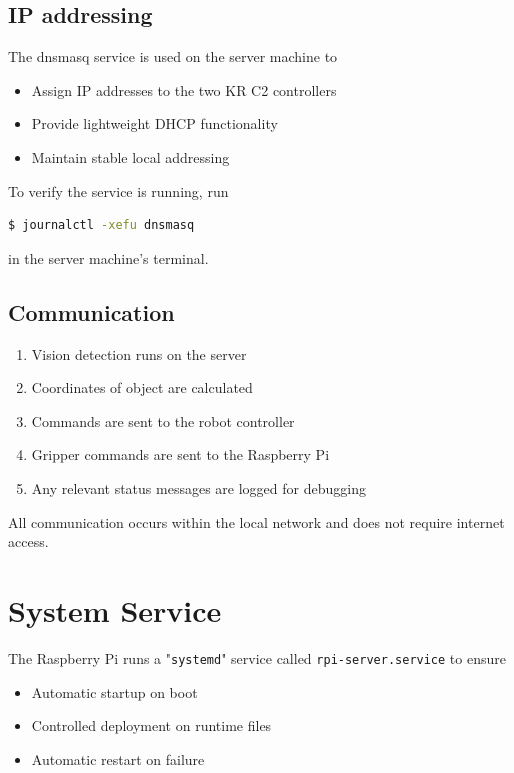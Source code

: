 \documentclass{ol-softwaremanual}
\begin{document}
\subsection{IP addressing}

The dnsmasq service is used on the server machine to
\begin{itemize}
    \item Assign IP addresses to the two KR C2 controllers
    \item Provide lightweight DHCP functionality
    \item Maintain stable local addressing
\end{itemize}

To verify the service is running, run
\begin{lstlisting}[language=bash, caption="verifying the dnsmasq service"]
    $ journalctl -xefu dnsmasq
\end{lstlisting}
in the server machine's terminal.

\subsection{Communication}
\begin{enumerate}
    \item Vision detection runs on the server
    \item Coordinates of object are calculated
    \item Commands are sent to the robot controller
    \item Gripper commands are sent to the Raspberry Pi
    \item Any relevant status messages are logged for debugging
\end{enumerate}
All communication occurs within the local network and does not require internet access.

\section{System Service}

The Raspberry Pi runs a "\lstinline{systemd}" service called \lstinline{rpi-server.service} to ensure
\begin{itemize}
    \item Automatic startup on boot
    \item Controlled deployment on runtime files
    \item Automatic restart on failure
\end{itemize}
\end{document}
